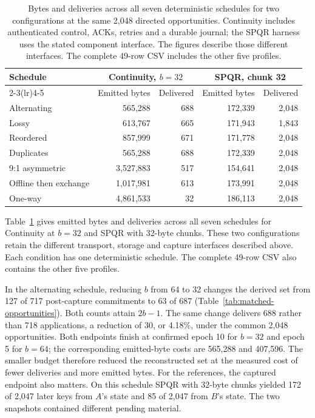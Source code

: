 \documentclass[pdflatex]{sn-jnl}
\theoremstyle{thmstyleone}
\theoremstyle{thmstylethree}
\theoremstyle{thmstyletwo}
\begin{document}
\begin{table}[t]
\centering
\small
\setlength{\tabcolsep}{4pt}
\begin{tabular}{@{}lrrrr@{}}
\toprule
Schedule & \multicolumn{2}{c}{Continuity, $b=32$} & \multicolumn{2}{c}{SPQR, chunk 32}\\
\cmidrule(lr){2-3}\cmidrule(lr){4-5}
 & Emitted bytes & Delivered & Emitted bytes & Delivered\\
\midrule
Alternating & 565,288 & 688 & 172,339 & 2,048\\
Lossy & 613,767 & 665 & 171,943 & 1,843\\
Reordered & 857,999 & 671 & 171,778 & 2,048\\
Duplicates & 565,288 & 688 & 172,339 & 2,048\\
9:1 asymmetric & 3,527,883 & 517 & 154,641 & 2,048\\
Offline then exchange & 1,017,981 & 613 & 173,991 & 2,048\\
One-way & 4,861,533 & 32 & 186,113 & 2,048\\
\bottomrule
\end{tabular}
\caption{Bytes and deliveries across all seven deterministic schedules for two configurations at the same 2,048 directed opportunities. Continuity includes authenticated control, ACKs, retries and a durable journal; the SPQR harness uses the stated component interface. The figures describe those different interfaces. The complete 49-row CSV includes the other five profiles.}
\label{tab:matched-schedule-costs}
\end{table}

Table~\ref{tab:matched-schedule-costs} gives emitted bytes and deliveries
across all seven schedules for Continuity at $b=32$ and SPQR with 32-byte
chunks. These two configurations retain the different transport, storage
and capture interfaces described above. Each condition has one deterministic
schedule. The complete 49-row CSV also contains the other five profiles.

In the alternating schedule, reducing $b$ from 64 to 32 changes the derived
set from 127 of 717 post-capture commitments to 63 of 687
(Table~\ref{tab:matched-opportunities}). Both counts attain $2b-1$.
The same change delivers 688 rather than 718 applications, a reduction of
30, or 4.18\%, under the common 2,048 opportunities. Both endpoints finish
at confirmed epoch 10 for $b=32$ and epoch 5 for $b=64$; the corresponding
emitted-byte costs are 565,288 and 407,596.
The smaller budget therefore reduced the reconstructed set at the measured
cost of fewer deliveries and more emitted bytes. For the references,
the captured endpoint also matters. On this schedule SPQR with 32-byte
chunks yielded 172 of 2,047 later keys from $A$'s state and 85 of 2,047
from $B$'s state.
The two snapshots contained different pending material.
\end{document}
